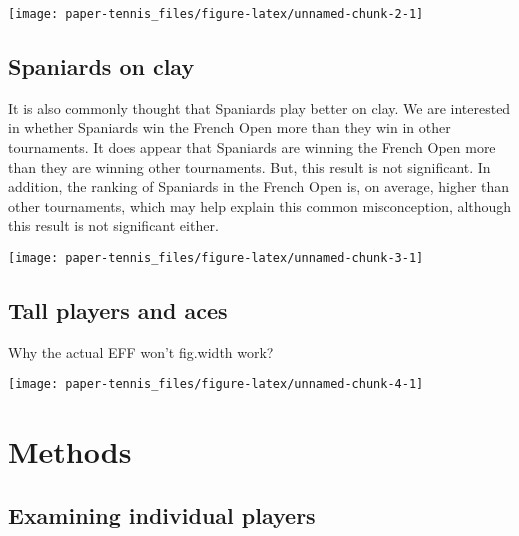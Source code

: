 \documentclass[]{article}
\begin{document}
\begin{center}\texttt{[image: paper-tennis\_files/figure-latex/unnamed-chunk-2-1]} \end{center}

\hypertarget{spaniards-on-clay}{%
\subsection{Spaniards on clay}\label{spaniards-on-clay}}

It is also commonly thought that Spaniards play better on clay. We are
interested in whether Spaniards win the French Open more than they win
in other tournaments. It does appear that Spaniards are winning the
French Open more than they are winning other tournaments. But, this
result is not significant. In addition, the ranking of Spaniards in the
French Open is, on average, higher than other tournaments, which may
help explain this common misconception, although this result is not
significant either.

\begin{center}\texttt{[image: paper-tennis\_files/figure-latex/unnamed-chunk-3-1]} \end{center}

\hypertarget{tall-players-and-aces}{%
\subsection{Tall players and aces}\label{tall-players-and-aces}}

Why the actual EFF won't fig.width work?

\begin{center}\texttt{[image: paper-tennis\_files/figure-latex/unnamed-chunk-4-1]} \end{center}

\hypertarget{sec:methods}{%
\section{Methods}\label{sec:methods}}

\hypertarget{examining-individual-players}{%
\subsection{Examining individual
players}\label{examining-individual-players}}
\end{document}
